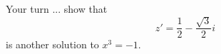 Your turn ... show that 
\[
z' = \frac{1}{2} - \frac{\sqrt{3}}{2}i
\] 
is another
solution to $x^3 = -1$.
